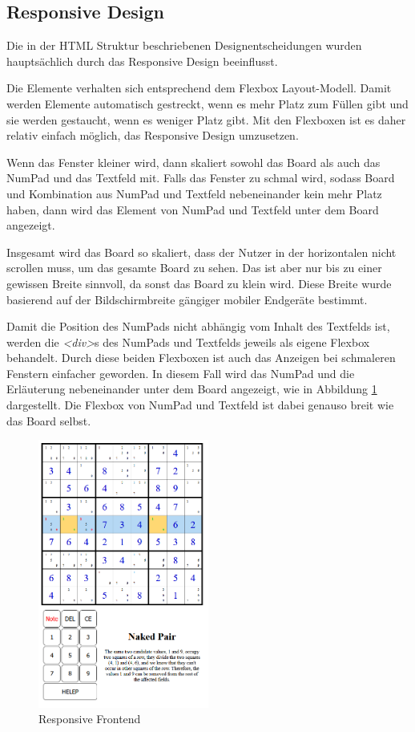 \subsection{Responsive Design}

Die in der \ac{HTML} Struktur beschriebenen Designentscheidungen wurden hauptsächlich durch das Responsive Design beeinflusst. 

Die Elemente verhalten sich entsprechend dem Flexbox Layout-Modell. Damit werden Elemente automatisch gestreckt, wenn es mehr Platz zum Füllen gibt und sie werden gestaucht, wenn es weniger Platz gibt. Mit den Flexboxen ist es daher relativ einfach möglich, das Responsive Design umzusetzen. 

Wenn das Fenster kleiner wird, dann skaliert sowohl das Board als auch das NumPad und das Textfeld mit. Falls das Fenster zu schmal wird, sodass Board und Kombination aus NumPad und Textfeld nebeneinander kein mehr Platz haben, dann wird das Element von NumPad und Textfeld unter dem Board angezeigt.

Insgesamt wird das Board so skaliert, dass der Nutzer in der horizontalen nicht scrollen muss, um das gesamte Board zu sehen. Das ist aber nur bis zu einer gewissen Breite sinnvoll, da sonst das Board zu klein wird. Diese Breite wurde basierend auf der Bildschirmbreite gängiger mobiler Endgeräte bestimmt.

Damit die Position des NumPads nicht abhängig vom Inhalt des Textfelds ist, werden die \textit{<div>}s des NumPads und Textfelds jeweils als eigene Flexbox behandelt. Durch diese beiden Flexboxen ist auch das Anzeigen bei schmaleren Fenstern einfacher geworden. In diesem Fall wird das NumPad und die Erläuterung nebeneinander unter dem Board angezeigt, wie in Abbildung \ref{fig:Responsiv} dargestellt. Die Flexbox von NumPad und Textfeld ist dabei genauso breit wie das Board selbst.

\begin{figure}[H]
	\centering
	\includegraphics[width=0.5\textwidth]{images/Bilduntereinander.png}
	\caption{Responsive Frontend}
	\label{fig:Responsiv}
\end{figure}

